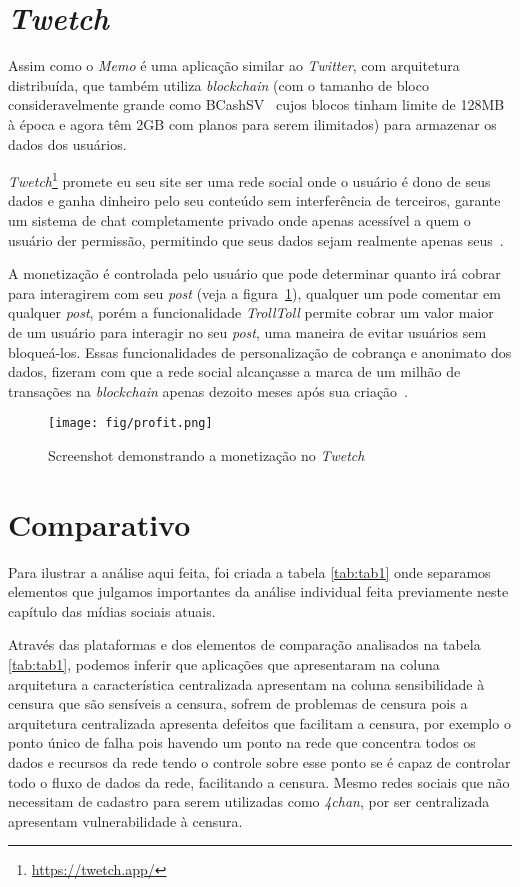 \section{\textit{Twetch}}

Assim como o \textit{Memo} é uma aplicação similar ao \textit{Twitter}, com arquitetura distribuída, que também utiliza \textit{blockchain} (com o tamanho de bloco consideravelmente grande como BCashSV~\cite{BTCSV} cujos blocos tinham limite de 128MB à época e agora têm 2GB com planos para serem ilimitados) para armazenar os dados dos usuários.

\textit{Twetch}\footnote{\url{https://twetch.app/}} promete eu seu site ser uma rede social onde o usuário é dono de seus dados e ganha dinheiro pelo seu conteúdo sem interferência de terceiros, garante um sistema de chat completamente privado onde apenas acessível a quem o usuário der permissão, permitindo que seus dados sejam realmente apenas seus~\cite{Twetch1}.

A monetização é controlada pelo usuário que pode determinar quanto irá cobrar para interagirem com seu \textit{post} (veja a figura~\ref{fig:twetch-profit}), qualquer um pode comentar em qualquer \textit{post}, porém a funcionalidade \textit{TrollToll} permite cobrar um valor maior de um usuário para interagir no seu \textit{post}, uma maneira de evitar usuários sem bloqueá-los.
Essas funcionalidades de personalização de cobrança e anonimato dos dados, fizeram com que a rede social alcançasse a marca de um milhão de transações na \textit{blockchain} apenas dezoito meses após sua criação~\cite{Twetch2}. 

\begin{figure}[htb!]
\centering
\texttt{[image: fig/profit.png]}
\caption[Monetização no Twetch]{
    \label{fig:twetch-profit} Screenshot demonstrando a monetização no \textit{Twetch}~\cite{Twetch1}
}
\end{figure}

\section{Comparativo}

Para ilustrar a análise aqui feita, foi criada a tabela \ref{tab:tab1} onde separamos elementos que julgamos importantes da análise individual feita previamente neste capítulo das mídias sociais atuais.

Através das plataformas e dos elementos de comparação analisados na tabela \ref{tab:tab1}, podemos inferir que aplicações que apresentaram na coluna arquitetura a característica centralizada  apresentam na coluna sensibilidade à censura que são sensíveis a  censura, sofrem de problemas de censura pois a arquitetura centralizada apresenta defeitos que facilitam a censura, por exemplo o ponto único de falha pois havendo um ponto na rede que concentra todos os dados e recursos da rede tendo o controle sobre esse ponto se é capaz de controlar todo o fluxo de dados da rede, facilitando a censura. Mesmo redes sociais que não necessitam de cadastro para serem utilizadas como \textit{4chan}, por ser centralizada apresentam vulnerabilidade à censura. 

